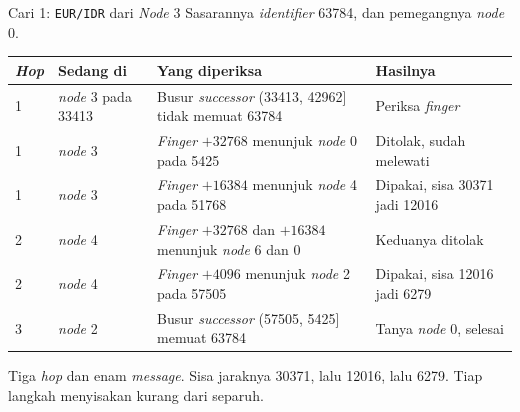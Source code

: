 \documentclass[aspectratio=169, table, 12pt]{beamer}
\begin{document}
\begin{frame}{{\Large Cari 1: \texttt{EUR/IDR} dari \textit{Node} 3}}
  \vspace{4pt}
  {\small Sasarannya \textit{identifier} 63784, dan pemegangnya \textit{node} 0.}
  \vspace{4pt}
  \centering
  \scriptsize
  \begin{tabularx}{0.97\textwidth}{|l|l|X|l|}
    \hline
    \textbf{\textit{Hop}} & \textbf{Sedang di} & \textbf{Yang diperiksa} & \textbf{Hasilnya} \\
    \hline
    1 & \textit{node} 3 pada 33413 & Busur \textit{successor} (33413, 42962] tidak memuat 63784 & Periksa \textit{finger} \\
    \hline
    1 & \textit{node} 3 & \textit{Finger} $+32768$ menunjuk \textit{node} 0 pada 5425 & Ditolak, sudah melewati \\
    \hline
    1 & \textit{node} 3 & \textit{Finger} $+16384$ menunjuk \textit{node} 4 pada 51768 & Dipakai, sisa 30371 jadi 12016 \\
    \hline
    2 & \textit{node} 4 & \textit{Finger} $+32768$ dan $+16384$ menunjuk \textit{node} 6 dan 0 & Keduanya ditolak \\
    \hline
    2 & \textit{node} 4 & \textit{Finger} $+4096$ menunjuk \textit{node} 2 pada 57505 & Dipakai, sisa 12016 jadi 6279 \\
    \hline
    3 & \textit{node} 2 & Busur \textit{successor} (57505, 5425] memuat 63784 & Tanya \textit{node} 0, selesai \\
    \hline
  \end{tabularx}

  \vspace{4pt}
  {\footnotesize Tiga \textit{hop} dan enam \textit{message}. Sisa jaraknya 30371, lalu
  12016, lalu 6279. Tiap langkah menyisakan kurang dari separuh.}
\end{frame}
\end{document}
